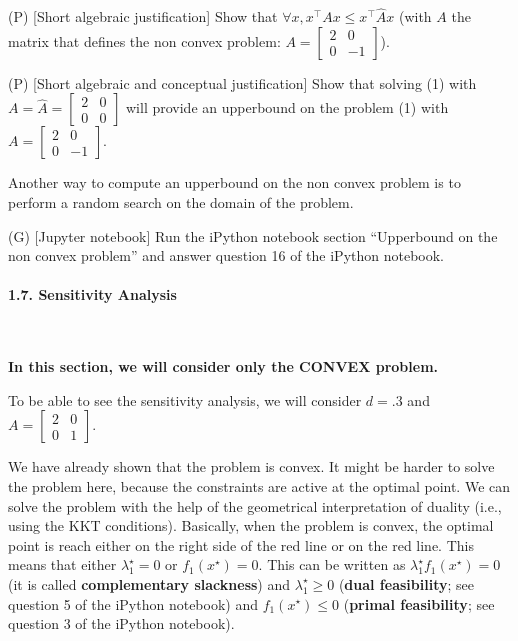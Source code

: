 \begin{enumerate}
    \qitem
    (P) [Short algebraic justification] Show that $\forall x, x^\top A x \leq x^\top \hat{A} x $ (with $A$ the matrix that defines the non convex problem: $A=\begin{bmatrix} 2 & 0 \\ 0 & -1\end{bmatrix}$).
    
    \sol{}
    \qitem (P) [Short algebraic and conceptual justification] Show that solving (1) with $A = \hat{A}=\begin{bmatrix} 2 & 0 \\ 0 & 0\end{bmatrix}$ will provide an upperbound on the problem (1) with $A=\begin{bmatrix} 2 & 0 \\ 0 & -1\end{bmatrix}$.
    
    \sol{}
\end{enumerate}

Another way to compute an upperbound on the non convex problem is to perform a random search on the domain of the problem.
\begin{enumerate}
    \setcounter{enumi}{2}
    \qitem
    (G) [Jupyter notebook] Run the iPython notebook section ``Upperbound on the non convex problem'' and answer question 16 of the iPython notebook.  
    
    \sol{}
\end{enumerate}

\paragraph{1.7. Sensitivity Analysis}\

\textbf{In this section, we will consider only the CONVEX problem.}

To be able to see the sensitivity analysis, we will consider $d=.3$ and $A = \begin{bmatrix} 2 & 0 \\ 0 & 1 \end{bmatrix}$.

We have already shown that the problem is convex.
It might be harder to solve the problem here, because the constraints are active at the optimal point.
We can solve the problem with the help of the geometrical interpretation of duality (i.e., using the KKT conditions).
Basically, when the problem is convex, the optimal point is reach either on the right side of the red line or on the red line.
This means that either $\lambda_1^\star = 0$ or $f_1(x^\star)=0$.
This can be written as $\lambda_1^\star f_1(x^\star)=0$ (it is called \textbf{complementary slackness}) and $\lambda_1^\star\geq 0$ (\textbf{dual feasibility}; see question 5 of the iPython notebook) and $f_1(x^\star)\leq 0$ (\textbf{primal feasibility}; see question 3 of the iPython notebook).

